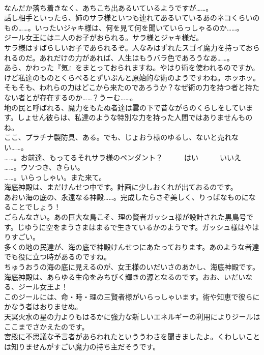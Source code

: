 \documentclass[8pt]{extreport}
\begin{document}
\begin{CJK}{UTF8}{min}
\\	なんだか落ち着きなく、あちこち出あるいているようですが……。	
\\	話し相手といったら、姉のサラ様といつも連れてあるいているあのネコくらいのもの……。いったいジャキ様は、何を見て何を聞いていらっしゃるのか……。	
\\	ジール女王にはニ人のお子がおられる。サラ様とジャキ様だ。	
\\	サラ様はすばらしいお子であられるぞ。人なみはずれたスゴイ魔力を持っておられるのだ。あれだけの力があれば、人生はもうバラ色であろうなあ……。	
\\	あら、かわった『気』をまとっておられますね。やはり術を使われるのですか。けど私達のものとくらべるとずいぶんと原始的な術のようですわね。ホッホッ。	
\\	そもそも、われらの力はどこから来たのであろうか？なぜ術の力を持つ者と持たない者とが存在するのか……？うーむ……。	
\\	地の民と呼ばれる、魔力をもたぬ者達は雲の下で昔ながらのくらしをしています。しょせん彼らは、私達のような特別な力を持った人間ではありませんものね。	
\\	ここ、プラチナ製防具、ある。でも、じょおう様のゆるし、ないと売れない……。	
\\	……。お前達、もってるそれサラ様のペンダント？　　　はい　　　いいえ	
\\	……。ウソつき、きらい。	
\\	……。いらっしゃい。また来て。	
\\	海底神殿は、まだけんせつ中です。計画に少しおくれが出ておるのです。	
\\	あおい海の底の、永遠なる神殿……。完成したらさぞ美しく、りっぱなものになることでしょう！	
\\	ごらんなさい。あの巨大な鳥こそ、理の賢者ガッシュ様が設計された黒鳥号です。じゆうに空をまうさまはまるで生きているかのようです。ガッシュ様はやはりすごい。	
\\	多くの地の民達が、海の底で神殿けんせつにあたっております。あのような者達でも役に立つ時があるのですね。	
\\	ちゅうおうの海の底に見えるのが、女王様のいだいさのあかし、海底神殿です。海底神殿は、あらゆる生命をみちびく輝きの源となるのです。おお、いだいなる、ジール女王よ！	
\\	このジールには、命・時・理の三賢者様がいらっしゃいます。術や知恵で彼らにかなう者はおりませぬ。 
\\	天冥火水の星の力よりもはるかに強力な新しいエネルギーの利用によりジールはここまでさかえたのです。	
\\	宮殿に不思議な予言者があらわれたといううわさを聞きましたよ。くわしいことは知りませんがすごい魔力の持ち主だそうです。	

\end{CJK}
\end{document}
